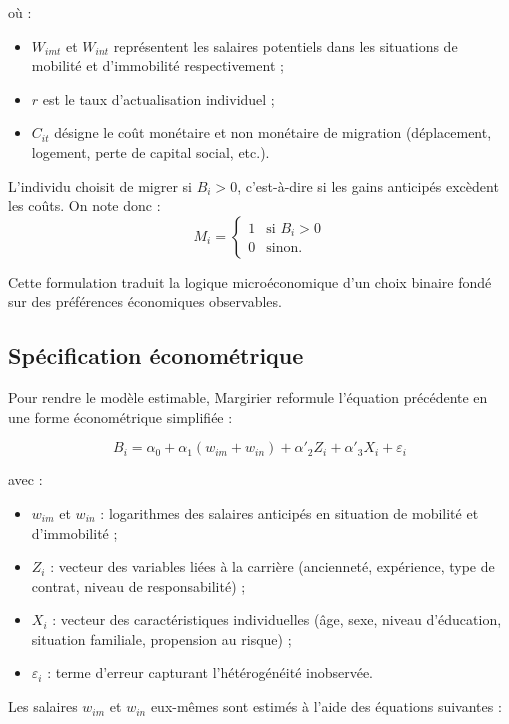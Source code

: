 \documentclass[12pt,a4paper]{article}
\begin{document}
où :
\begin{itemize}
    \item $W_{imt}$ et $W_{int}$ représentent les salaires potentiels dans les situations de mobilité et d’immobilité respectivement ;
    \item $r$ est le taux d’actualisation individuel ;
    \item $C_{it}$ désigne le coût monétaire et non monétaire de migration (déplacement, logement, perte de capital social, etc.).
\end{itemize}

L’individu choisit de migrer si $B_i > 0$, c’est-à-dire si les gains anticipés excèdent les coûts.  
On note donc :
\[
M_i =
\begin{cases}
1 & \text{si } B_i > 0 \\
0 & \text{sinon.}
\end{cases}
\]

Cette formulation traduit la logique microéconomique d’un choix binaire fondé sur des préférences économiques observables.

\subsection{Spécification économétrique}

Pour rendre le modèle estimable, Margirier reformule l’équation précédente en une forme économétrique simplifiée :

\begin{equation}
B_i = \alpha_0 + \alpha_1 (w_{im} + w_{in}) + \alpha'_2 Z_i + \alpha'_3 X_i + \varepsilon_i
\end{equation}

avec :
\begin{itemize}
    \item $w_{im}$ et $w_{in}$ : logarithmes des salaires anticipés en situation de mobilité et d’immobilité ;
    \item $Z_i$ : vecteur des variables liées à la carrière (ancienneté, expérience, type de contrat, niveau de responsabilité) ;
    \item $X_i$ : vecteur des caractéristiques individuelles (âge, sexe, niveau d’éducation, situation familiale, propension au risque) ;
    \item $\varepsilon_i$ : terme d’erreur capturant l’hétérogénéité inobservée.
\end{itemize}

Les salaires $w_{im}$ et $w_{in}$ eux-mêmes sont estimés à l’aide des équations suivantes :
\end{document}
